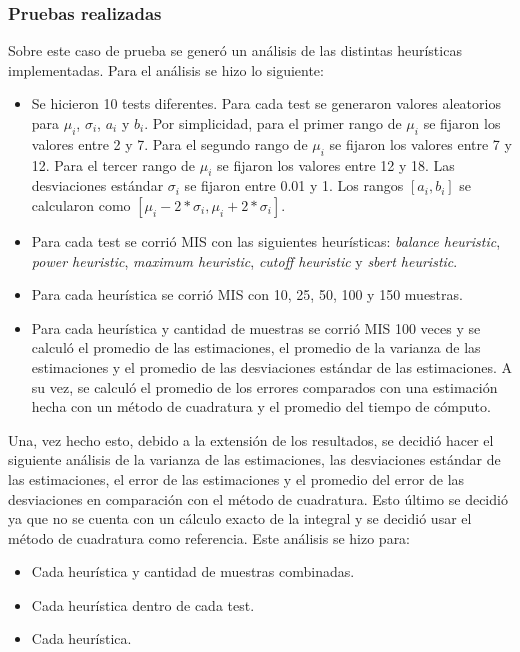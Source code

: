 \documentclass{article}
\begin{document}
\subsubsection{Pruebas realizadas}

Sobre este caso de prueba se generó un análisis de las distintas heurísticas implementadas.
Para el análisis se hizo lo siguiente:
\begin{itemize}
    \item Se hicieron 10 tests diferentes. Para cada test se generaron valores aleatorios para \( \mu_{i} \), \( \sigma_{i} \), \( a_{i} \) y \( b_{i} \).
          Por simplicidad, para el primer rango de  \( \mu_{i} \) se fijaron los valores entre 2 y 7.
          Para el segundo rango de \( \mu_{i} \) se fijaron los valores entre 7 y 12.
          Para el tercer rango de \( \mu_{i} \) se fijaron los valores entre 12 y 18.
          Las desviaciones estándar \( \sigma_{i} \) se fijaron entre 0.01 y 1.
          Los rangos \( [a_{i}, b_{i}] \) se calcularon como \( [ \mu_{i} - 2 * \sigma_{i}, \mu_{i} + 2 * \sigma_{i} ] \).
    \item Para cada test se corrió MIS con las siguientes heurísticas: \textit{balance heuristic}, \textit{power heuristic}, \textit{maximum heuristic}, \textit{cutoff heuristic} y \textit{sbert heuristic}.
    \item Para cada heurística se corrió MIS con 10, 25, 50, 100 y 150 muestras.
    \item Para cada heurística y cantidad de muestras se corrió MIS 100 veces y se calculó el promedio de las estimaciones,
          el promedio de la varianza de las estimaciones y el promedio de las desviaciones estándar de las estimaciones.
          A su vez, se calculó el promedio de los errores comparados con una estimación hecha con un método de cuadratura y el promedio del tiempo de cómputo.
\end{itemize}

Una, vez hecho esto, debido a la extensión de los resultados, se decidió hacer el siguiente análisis de la varianza de las estimaciones, las desviaciones estándar de las estimaciones, el error de las estimaciones y el promedio del error de las desviaciones en comparación con el método de cuadratura.
Esto último se decidió ya que no se cuenta con un cálculo exacto de la integral y se decidió usar el método de cuadratura como referencia.
Este análisis se hizo para:

\begin{itemize}
    \item Cada heurística y cantidad de muestras combinadas.
    \item Cada heurística dentro de cada test.
    \item Cada heurística.
\end{itemize}
\end{document}

